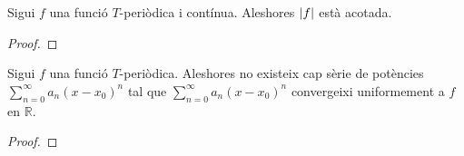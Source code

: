 \documentclass[../../Main.tex]{subfiles}
\begin{document}
	\begin{lemma}
		\label{lema:les funciones periòdiques i contínues estàn acotades}
		Sigui \(f\) una funció \(T\)-periòdica i contínua. Aleshores \(\abs{f}\) està acotada.
		\begin{proof}
		\end{proof}
	\end{lemma}
	\begin{lemma}
		\label{lema:les funcions periòdiques no poden ser aproximades per una sèrie de potències}
		Sigui \(f\) una funció \(T\)-periòdica. Aleshores no existeix cap sèrie de potències \(\sum_{n=0}^{\infty}a_{n}(x-x_{0})^{n}\) tal que \(\sum_{n=0}^{\infty}a_{n}(x-x_{0})^{n}\) convergeixi uniformement a \(f\) en \(\mathbb{R}\).
		\begin{proof}
		\end{proof}
	\end{lemma}
\end{document}
